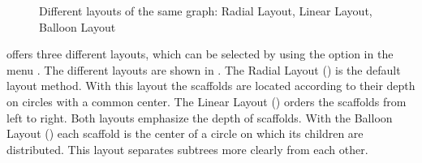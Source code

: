\begin{figure}[!htb]
{      \label{fig:treeview:layout:linear}
   }
   \quad
   \caption[\Stview layouts]{
      Different layouts of the same graph:  Radial Layout,  Linear Layout,  Balloon Layout
   }
   \label{fig:treeview:layout}
\end{figure}
\sh offers three different layouts, which can be selected by using the
 option in the  menu .
The different layouts are shown in . The Radial Layout
() is the default layout method. 
With this layout the scaffolds are located according to their depth on circles
with a common center. The Linear Layout () orders the
scaffolds from left to right. Both layouts emphasize the depth of scaffolds.
With the Balloon Layout () each scaffold is the
center of a circle on which its children are distributed. This 
layout separates subtrees more clearly from each other.

